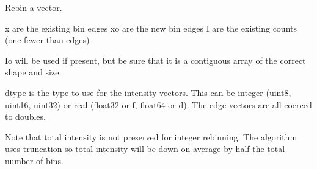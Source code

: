 \documentclass[letterpaper,10pt,english]{sphinxmanual}
\begin{document}
\begin{fulllineitems}
\label{api/rebin:refl1d.rebin.rebin}
Rebin a vector.

x are the existing bin edges
xo are the new bin edges
I are the existing counts (one fewer than edges)

Io will be used if present, but be sure that it is a contiguous
array of the correct shape and size.

dtype is the type to use for the intensity vectors.  This can be
integer (uint8, uint16, uint32) or real (float32 or f, float64 or d).
The edge vectors are all coerced to doubles.

Note that total intensity is not preserved for integer rebinning.
The algorithm uses truncation so total intensity will be down on
average by half the total number of bins.

\end{fulllineitems}

\end{document}
